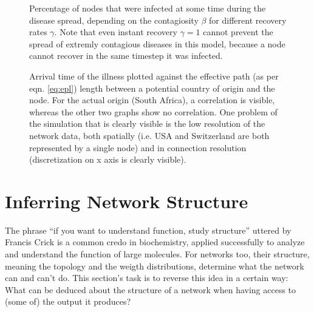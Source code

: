 \documentclass{scrartcl}
\begin{document}
\begin{figure}
    \centering
    \caption{Percentage of nodes that were infected at some time during the disease spread, 
		depending on the contagiosity $\beta$ for different recovery rates $\gamma$. Note that 
		even instant recovery $\gamma=1$ cannot prevent the spread of extremly contagious diseases
		in this model, because a node cannot recover in the same timestep it was infected.}
    \label{fig:D12}
\end{figure}

\begin{figure}
    \centering
    \caption{Arrival time of the illness plotted against the effective path (as per eqn. \ref{eq:epl}) length between 
		a potential country of origin and the node. For the actual origin (South Africa), a correlation is visible, whereas the other two graphs show no correlation. One problem of the simulation that is clearly visible is the low resolution of the network data, both spatially (i.e. USA and Switzerland are both represented by a single node) and in connection resolution (discretization on x axis is clearly visible).}
    \label{fig:arrival}
\end{figure}

\clearpage
\section{Inferring Network Structure}
The phrase \enquote{if you want to understand function, study structure}
uttered by Francis Crick is a common credo in biochemistry, applied
successfully to analyze and understand the function of large molecules. For
networks too, their structure, meaning the topology and the weigth
distributions, determine what the network can and can't do. This section's
task is to reverse this idea in a certain way: What can be deduced about
the structure of a network when having access to (some of) the output it
produces?
\end{document}

